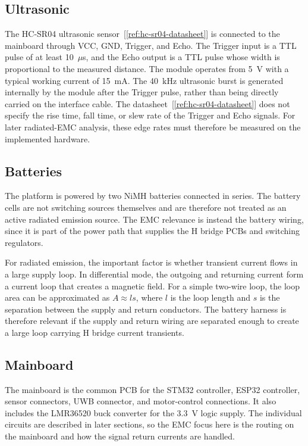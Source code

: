 \subsection{Ultrasonic}
The HC-SR04 ultrasonic sensor~[\ref{ref:hc-sr04-datasheet}] is connected to the mainboard through VCC, GND, Trigger, and Echo. The Trigger input is a TTL pulse of at least 10~$\mu$s, and the Echo output is a TTL pulse whose width is proportional to the measured distance. The module operates from 5~$\mathrm{V}$ with a typical working current of 15~$\mathrm{mA}$. The 40~$\mathrm{kHz}$ ultrasonic burst is generated internally by the module after the Trigger pulse, rather than being directly carried on the interface cable. The datasheet~[\ref{ref:hc-sr04-datasheet}] does not specify the rise time, fall time, or slew rate of the Trigger and Echo signals. For later radiated-EMC analysis, these edge rates must therefore be measured on the implemented hardware.




\subsection{Batteries}
The platform is powered by two NiMH batteries connected in series. The battery cells are
not switching sources themselves and are therefore not treated as an active radiated
emission source. The EMC relevance is instead the battery wiring, since it is part of the
power path that supplies the H bridge PCBs and switching regulators.

For radiated emission, the important factor is whether transient current flows in a large
supply loop. In differential mode, the outgoing and returning current form a current loop
that creates a magnetic field. For a simple two-wire loop, the loop area can be
approximated as \(A \approx ls\), where \(l\) is the loop length and \(s\) is the separation
between the supply and return conductors. The battery harness is therefore relevant if the
supply and return wiring are separated enough to create a large loop carrying H bridge
current transients.

\subsection{Mainboard}

The mainboard is the common PCB for the STM32 controller, ESP32 controller, sensor connectors, UWB connector, and motor-control connections. It also includes the LMR36520 buck converter for the 3.3~V logic supply.
The individual circuits are described in later sections, so the EMC focus here is the routing
on the mainboard and how the signal return currents are handled.

